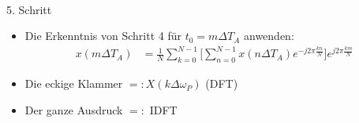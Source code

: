 \documentclass[12pt,a4paper]{scrartcl}
\begin{document}
\noindent \\ 5. Schritt
 \begin{itemize}
  \item Die Erkenntnis von Schritt 4 für $t_0 = m\Delta T_A$ anwenden: 
  \begin{equation}
    \label{eq:21}
    \begin{split}
      x(m\Delta T_A) &= \frac{1}{N} \sum_{k = 0}^{N -1} \Bigg[ \sum_{n = 0}^{N -1}  x(n \Delta T_A) e^{- j 2\pi \frac{k n}{N}} \Bigg] e^{j2\pi \frac{km}{N} }
    \end{split}
  \end{equation}
  \item Die eckige Klammer $ =: X(k\Delta \omega_P)$ (DFT)
  \item Der ganze Ausdruck $ =:$ IDFT
\end{itemize}
\end{document}
